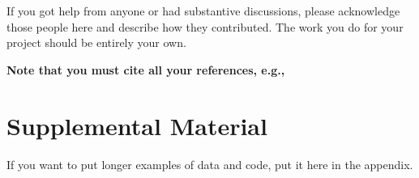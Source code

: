 \documentclass[11pt,a4paper]{article}
\begin{document}
If you got help from anyone or had substantive discussions, please acknowledge
those people here and describe how they contributed.  The work you do for your
project should be entirely your own.




\textbf{\color{red} Note that you must cite all your references, e.g., \cite{wang2014studentlife}}

\appendix

\section{Supplemental Material}
\label{sec:supplemental}

If you want to put longer examples of data and code, put it here in the appendix.  
\end{document}
